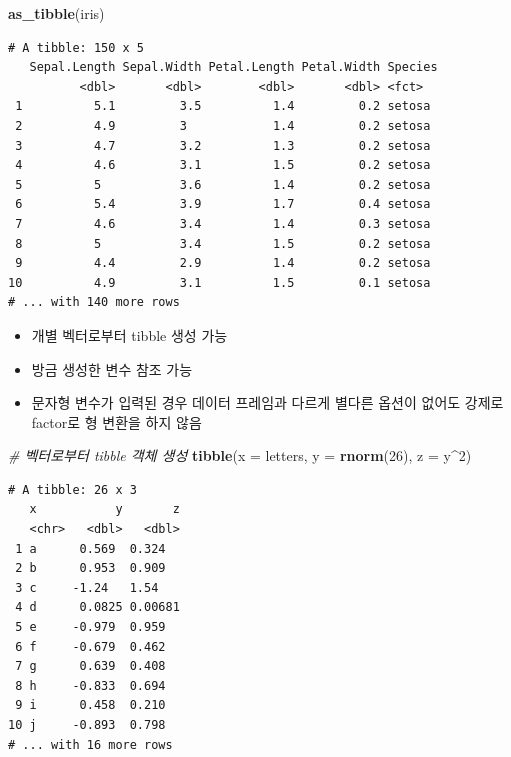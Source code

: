 \documentclass[
  11pt,
]{krantz}
\newenvironment{Shaded}{\begin{snugshade}}{\end{snugshade}}
\newcommand{\CommentTok}[1]{\textcolor[rgb]{0.37,0.37,0.37}{\textit{#1}}}
\newcommand{\DataTypeTok}[1]{\textcolor[rgb]{0.27,0.27,0.27}{#1}}
\newcommand{\DecValTok}[1]{\textcolor[rgb]{0.06,0.06,0.06}{#1}}
\newcommand{\KeywordTok}[1]{\textcolor[rgb]{0.27,0.27,0.27}{\textbf{#1}}}
\newcommand{\NormalTok}[1]{#1}
\newcommand{\OperatorTok}[1]{\textcolor[rgb]{0.43,0.43,0.43}{\textbf{#1}}}
\providecommand{\tightlist}{%
  \setlength{\itemsep}{0pt}\setlength{\parskip}{0pt}}
\begin{document}
\begin{Shaded}
\begin{Highlighting}[]
\KeywordTok{as_tibble}\NormalTok{(iris)}
\end{Highlighting}
\end{Shaded}

\begin{verbatim}
# A tibble: 150 x 5
   Sepal.Length Sepal.Width Petal.Length Petal.Width Species
          <dbl>       <dbl>        <dbl>       <dbl> <fct>  
 1          5.1         3.5          1.4         0.2 setosa 
 2          4.9         3            1.4         0.2 setosa 
 3          4.7         3.2          1.3         0.2 setosa 
 4          4.6         3.1          1.5         0.2 setosa 
 5          5           3.6          1.4         0.2 setosa 
 6          5.4         3.9          1.7         0.4 setosa 
 7          4.6         3.4          1.4         0.3 setosa 
 8          5           3.4          1.5         0.2 setosa 
 9          4.4         2.9          1.4         0.2 setosa 
10          4.9         3.1          1.5         0.1 setosa 
# ... with 140 more rows
\end{verbatim}

\normalsize

\begin{itemize}
\tightlist
\item
  개별 벡터로부터 tibble 생성 가능
\item
  방금 생성한 변수 참조 가능
\item
  문자형 변수가 입력된 경우 데이터 프레임과 다르게 별다른 옵션이 없어도 강제로 factor로 형 변환을 하지 않음
\end{itemize}

\footnotesize

\begin{Shaded}
\begin{Highlighting}[]
\CommentTok{# 벡터로부터 tibble 객체 생성}
\KeywordTok{tibble}\NormalTok{(}\DataTypeTok{x =}\NormalTok{ letters, }\DataTypeTok{y =} \KeywordTok{rnorm}\NormalTok{(}\DecValTok{26}\NormalTok{), }\DataTypeTok{z =}\NormalTok{ y}\OperatorTok{^}\DecValTok{2}\NormalTok{)}
\end{Highlighting}
\end{Shaded}

\begin{verbatim}
# A tibble: 26 x 3
   x           y       z
   <chr>   <dbl>   <dbl>
 1 a      0.569  0.324  
 2 b      0.953  0.909  
 3 c     -1.24   1.54   
 4 d      0.0825 0.00681
 5 e     -0.979  0.959  
 6 f     -0.679  0.462  
 7 g      0.639  0.408  
 8 h     -0.833  0.694  
 9 i      0.458  0.210  
10 j     -0.893  0.798  
# ... with 16 more rows
\end{verbatim}
\end{document}
